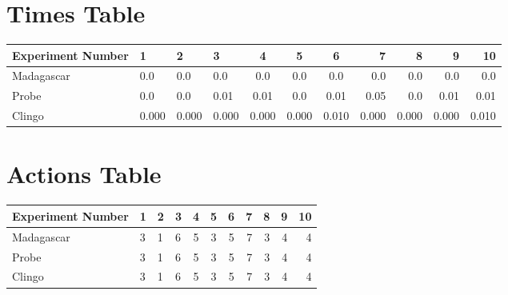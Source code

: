 \documentclass[8pt]{article}
\begin{document}
\begin{landscape}
\section{Times Table}\begin{tabular}{ | l | l | l | l | c | c | c | r | r | r | r | }\hline
Experiment Number & 1 & 2 & 3 & 4 & 5 & 6 & 7 & 8 & 9 & 10\\  \hline
Madagascar & 0.0 & 0.0 & 0.0 & 0.0 & 0.0 & 0.0 & 0.0 & 0.0 & 0.0 & 0.0\\  \hline
Probe & 0.0 & 0.0 & 0.01 & 0.01 & 0.0 & 0.01 & 0.05 & 0.0 & 0.01 & 0.01\\  \hline
Clingo & 0.000 & 0.000 & 0.000 & 0.000 & 0.000 & 0.010 & 0.000 & 0.000 & 0.000 & 0.010\\  \hline
\end{tabular}
\section{Actions Table}\begin{tabular}{ | l | l | l | l | c | c | c | r | r | r | r | }\hline
Experiment Number & 1 & 2 & 3 & 4 & 5 & 6 & 7 & 8 & 9 & 10\\ \hline
 Madagascar & 3 & 1 & 6 & 5 & 3 & 5 & 7 & 3 & 4 & 4\\ \hline
 Probe & 3 & 1 & 6 & 5 & 3 & 5 & 7 & 3 & 4 & 4\\ \hline
 Clingo & 3 & 1 & 6 & 5 & 3 & 5 & 7 & 3 & 4 & 4\\ \hline
\end{tabular}
\end{landscape}
\end{document}

